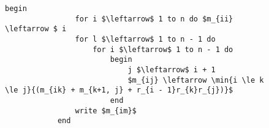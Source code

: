 \documentclass{subfiles}
\begin{document}
\begin{figure*}[!h]
    \centering
    \begin{subfigure}[b]{0.6\textwidth}
        \begin{lstlisting}[language = algol]
            begin
                for i $\leftarrow$ 1 to n do $m_{ii} \leftarrow $ i
                for l $\leftarrow$ 1 to n - 1 do
                    for i $\leftarrow$ 1 to n - 1 do
                        begin
                            j $\leftarrow$ i + 1
                            $m_{ij} \leftarrow \min{i \le k \le j}{(m_{ik} + m_{k+1, j} + r_{i - 1}r_{k}r_{j})}$
                        end
                write $m_{im}$
            end
        \end{lstlisting}
    \end{subfigure}
\end{figure*}
\end{document}
